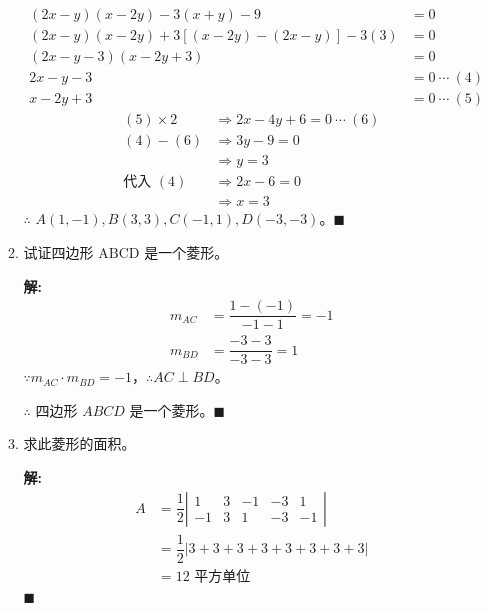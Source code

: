 \documentclass[10pt]{article}
\newcommand{\sol}{\textbf{解:} }
\begin{document}
\begin{enumerate}[leftmargin=*]
\begin{enumerate}
\begin{align*}
                  (2x - y)(x - 2y) - 3(x + y) - 9                  & = 0              \\
                  (2x - y)(x - 2y) + 3[(x - 2y) - (2x - y)] - 3(3) & = 0              \\
                  (2x - y - 3)(x - 2y + 3)                         & = 0              \\
                  2x - y - 3                                       & = 0\ \cdots\ (4) \\
                  x - 2y + 3                                       & = 0\ \cdots\ (5)
                \end{align*}
                \begin{align*}
                  (5) \times 2  & \Rightarrow 2x - 4y + 6 = 0\ \cdots\ (6) \\
                  (4) - (6)     & \Rightarrow 3y - 9 = 0                   \\
                                & \Rightarrow y = 3                        \\
                  \text{代入 }(4) & \Rightarrow 2x - 6 = 0                   \\
                                & \Rightarrow x = 3
                \end{align*}
                $\therefore$ $A(1, -1), B(3, 3), C(-1, 1), D(-3, -3)$。\hfill$\blacksquare$

          \item 试证四边形 $\mathrm{ABCD}$ 是一个菱形。

                \sol{}
                \begin{align*}
                  m_{AC} & = \dfrac{1 - (-1)}{-1 - 1} = -1 \\
                  m_{BD} & = \dfrac{-3 - 3}{-3 - 3} = 1
                \end{align*}
                $\because m_{AC} \cdot m_{BD} = -1$，$\therefore AC \perp BD$。

                $\therefore$ 四边形 $ABCD$ 是一个菱形。\hfill$\blacksquare$

          \item 求此菱形的面积。

                \sol{}
                \begin{align*}
                  A & = \dfrac{1}{2} \left\vert\begin{matrix}
                                                 1  & 3 & -1 & -3 & 1  \\
                                                 -1 & 3 & 1  & -3 & -1
                                               \end{matrix}\right\vert           \\
                    & = \dfrac{1}{2} \left\vert3 + 3 + 3 + 3+ 3+3+3+3\right\vert \\
                    & = 12 \text{ 平方单位}
                \end{align*} \hfill$\blacksquare$
        \end{enumerate}


\end{enumerate}
\end{document}
